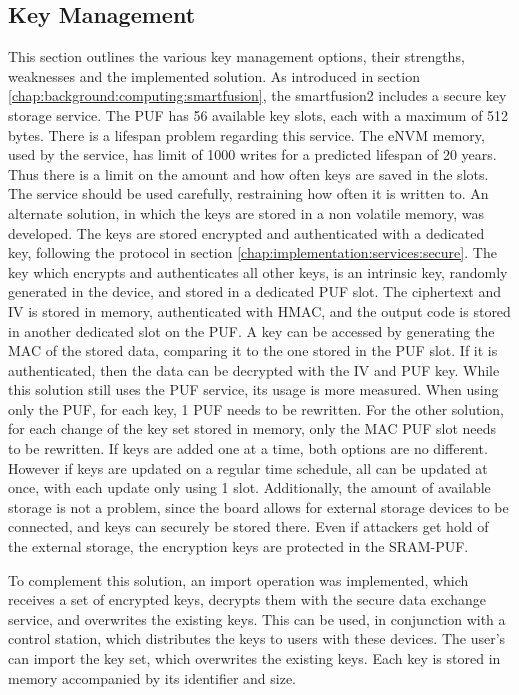\subsection{Key Management}\label{chap:implementation:services:key-import}

This section outlines the various key management options, their strengths, weaknesses and the implemented solution. 
As introduced in section \ref{chap:background:computing:smartfusion}, the smartfusion2 includes a secure key storage service. The PUF has 56 available key slots, each with a maximum of 512 bytes. There is a lifespan problem regarding this service. The eNVM memory, used by the service, has limit of 1000 writes for a predicted lifespan of 20 years. Thus there is a limit on the amount and how often keys are saved in the slots. The service should be used carefully, restraining how often it is written to.
An alternate solution, in which the keys are stored in a non volatile memory, was developed. The keys are stored encrypted and authenticated with a dedicated key, following the protocol in section \ref{chap:implementation:services:secure}.
The key which encrypts and authenticates all other keys, is an intrinsic key, randomly generated in the device, and stored in a dedicated PUF slot. The ciphertext and IV is stored in memory, authenticated with HMAC, and the output code is stored in another dedicated slot on the PUF.
A key can be accessed by generating the MAC of the stored data, comparing it to the one stored in the PUF slot. If it is authenticated, then the data can be decrypted with the IV and PUF key.
While this solution still uses the PUF service, its usage is more measured. When using only the PUF, for each key, 1 PUF needs to be rewritten. For the other solution, for each change of the key set stored in memory, only the MAC PUF slot needs to be rewritten. If keys are added one at a time, both options are no different. However if keys are updated on a regular time schedule, all can be updated at once, with each update only using 1 slot. Additionally, the amount of available storage is not a problem, since the board allows for external storage devices to be connected, and keys can securely be stored there. Even if attackers get hold of the external storage, the encryption keys are protected in the SRAM-PUF.

To complement this solution, an import operation was implemented, which receives a set of encrypted keys, decrypts them with the secure data exchange service, and overwrites the existing keys. This can be used, in conjunction with a control station, which distributes the keys to users with these devices. The user's can import the key set, which overwrites the existing keys.
Each key is stored in memory accompanied by its identifier and size.

